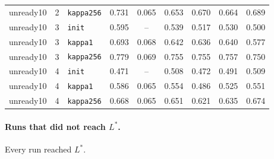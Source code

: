 \begin{table}[htbp]
{\begin{tabular}{lllcccccc}
unready10 & 2 & \texttt{kappa256} & 0.731 & 0.065 & 0.653 & 0.670 & 0.664 & 0.689 \\
unready10 & 3 & \texttt{init} & 0.595 & -- & 0.539 & 0.517 & 0.530 & 0.500 \\
unready10 & 3 & \texttt{kappa1} & 0.693 & 0.068 & 0.642 & 0.636 & 0.640 & 0.577 \\
unready10 & 3 & \texttt{kappa256} & 0.779 & 0.069 & 0.755 & 0.755 & 0.757 & 0.750 \\
unready10 & 4 & \texttt{init} & 0.471 & -- & 0.508 & 0.472 & 0.491 & 0.509 \\
unready10 & 4 & \texttt{kappa1} & 0.586 & 0.065 & 0.554 & 0.486 & 0.525 & 0.551 \\
unready10 & 4 & \texttt{kappa256} & 0.668 & 0.065 & 0.651 & 0.621 & 0.635 & 0.674 \\
\bottomrule\end{tabular}}\end{table}
\paragraph{Runs that did not reach $L^\ast$.}
Every run reached $L^\ast$.
